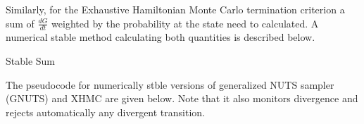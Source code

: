 \documentclass[]{report}
\begin{document}
Similarly, for the Exhaustive Hamiltonian Monte Carlo termination criterion a sum of $\frac{dG}{dt}$ weighted by the probability at the state need to calculated. A numerical stable method calculating both quantities is described below.

\begin{algorithm}
\DontPrintSemicolon
{}

\caption{Stable Sum }
\end{algorithm}

The pseudocode for numerically stble versions of generalized NUTS sampler (GNUTS) and XHMC are given below. Note that it also monitors divergence and rejects automatically any divergent transition.
\end{document}
